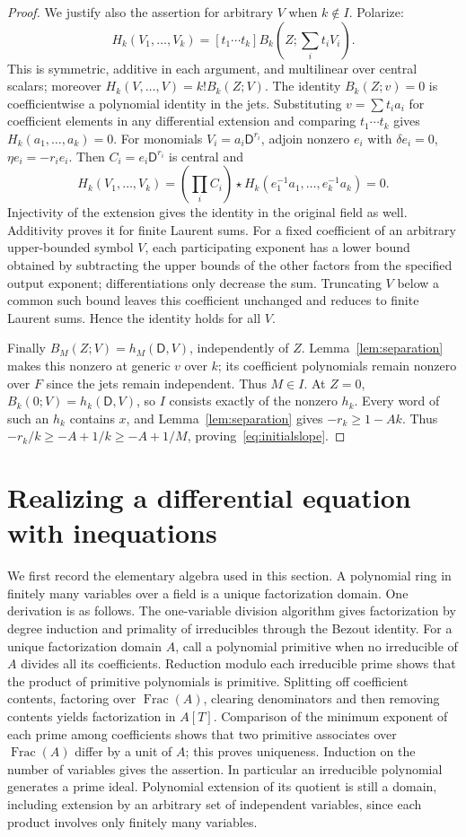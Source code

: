 \documentclass{article}
\newcommand{\DD}{\mathsf D}
\newcommand{\Frac}{\operatorname{Frac}}
\begin{document}
\begin{proof}
We justify also the assertion for arbitrary $V$ when $k\notin I$. Polarize:
\[
 H_k(V_1,\ldots,V_k)=[t_1\cdots t_k]
 B_k\left(Z;\sum_i t_iV_i\right).
\]
This is symmetric, additive in each argument, and multilinear over central scalars; moreover $H_k(V,\ldots,V)=k!B_k(Z;V)$. The identity $B_k(Z;v)=0$ is coefficientwise a polynomial identity in the jets. Substituting $v=\sum t_i a_i$ for coefficient elements in any differential extension and comparing $t_1\cdots t_k$ gives $H_k(a_1,\ldots,a_k)=0$. For monomials $V_i=a_i\DD^{r_i}$, adjoin nonzero $e_i$ with $\delta e_i=0$, $\eta e_i=-r_ie_i$. Then $C_i=e_i\DD^{r_i}$ is central and
\[
 H_k(V_1,\ldots,V_k)
 =\left(\prod_i C_i\right)\star H_k(e_1^{-1}a_1,\ldots,e_k^{-1}a_k)=0.
\]
Injectivity of the extension gives the identity in the original field as well. Additivity proves it for finite Laurent sums. For a fixed coefficient of an arbitrary upper-bounded symbol $V$, each participating exponent has a lower bound obtained by subtracting the upper bounds of the other factors from the specified output exponent; differentiations only decrease the sum. Truncating $V$ below a common such bound leaves this coefficient unchanged and reduces to finite Laurent sums. Hence the identity holds for all $V$.

Finally $B_M(Z;V)=h_M(\DD,V)$, independently of $Z$. Lemma~\ref{lem:separation} makes this nonzero at generic $v$ over $k$; its coefficient polynomials remain nonzero over $F$ since the jets remain independent. Thus $M\in I$. At $Z=0$, $B_k(0;V)=h_k(\DD,V)$, so $I$ consists exactly of the nonzero $h_k$. Every word of such an $h_k$ contains $x$, and Lemma~\ref{lem:separation} gives
$-r_k\geq1-Ak$. Thus $-r_k/k\geq-A+1/k\geq-A+1/M$, proving~\eqref{eq:initialslope}.
\end{proof}

\section{Realizing a differential equation with inequations}\label{sec:branch}
We first record the elementary algebra used in this section. A polynomial ring in finitely many variables over a field is a unique factorization domain. One derivation is as follows. The one-variable division algorithm gives factorization by degree induction and primality of irreducibles through the Bezout identity. For a unique factorization domain $A$, call a polynomial primitive when no irreducible of $A$ divides all its coefficients. Reduction modulo each irreducible prime shows that the product of primitive polynomials is primitive. Splitting off coefficient contents, factoring over $\Frac(A)$, clearing denominators and then removing contents yields factorization in $A[T]$. Comparison of the minimum exponent of each prime among coefficients shows that two primitive associates over $\Frac(A)$ differ by a unit of $A$; this proves uniqueness. Induction on the number of variables gives the assertion. In particular an irreducible polynomial generates a prime ideal. Polynomial extension of its quotient is still a domain, including extension by an arbitrary set of independent variables, since each product involves only finitely many variables.
\end{document}
